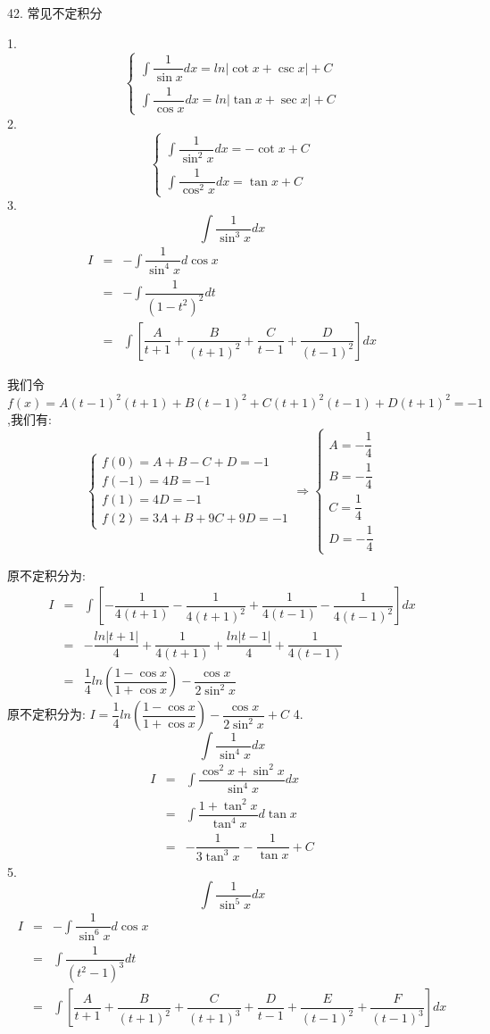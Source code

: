42. 常见不定积分
\begin{anymark}[常见不定积分]
	1. $$\left\lbrace
	\begin{array}{l}
		\int \dfrac{1}{\sin x}dx=ln|\cot x+\csc x|+C\\
		\int \dfrac{1}{\cos x}dx=ln|\tan x+\sec x|+C
	\end{array}
	\right.$$
	2. $$\left\lbrace
	\begin{array}{l}
		\int \dfrac{1}{\sin^2 x}dx=-\cot x+C\\
		\int \dfrac{1}{\cos^2 x}dx=\tan x+C
	\end{array}
	\right.$$
	3. $$\int \dfrac{1}{\sin^3 x}dx$$
	\begin{eqnarray*}
		I&=&-\int \dfrac{1}{\sin^4 x}d\cos x\\
		&=&-\int \dfrac{1}{(1-t^2)^2}dt\\
		&=&\int\left[ \dfrac{A}{t+1}+\dfrac{B}{(t+1)^2}+\dfrac{C}{t-1}+\dfrac{D}{(t-1)^2}\right]dx 
	\end{eqnarray*}
	
	我们令$f(x)=A(t-1)^2(t+1)+B(t-1)^2+C(t+1)^2(t-1)+D(t+1)^2=-1$,我们有:  
	$$\left\lbrace
	\begin{array}{l}
		f(0)=A+B-C+D=-1\\
		f(-1)=4B=-1\\
		f(1)=4D=-1\\
		f(2)=3A+B+9C+9D=-1
	\end{array}
	\right. \Rightarrow \left\lbrace
	\begin{array}{l}
		A=-\dfrac{1}{4}\\
		B=-\dfrac{1}{4}\\
		C=\dfrac{1}{4}\\
		D=-\dfrac{1}{4}
	\end{array}
	\right. $$
	
	原不定积分为:  
	\begin{eqnarray*}
		I&=&\int\left[ -\dfrac{1}{4(t+1)}-\dfrac{1}{4(t+1)^2}+\dfrac{1}{4(t-1)}-\dfrac{1}{4(t-1)^2}\right]dx\\
		&=&-\dfrac{ln|t+1|}{4}+\dfrac{1}{4(t+1)}+\dfrac{ln|t-1|}{4}+\dfrac{1}{4(t-1)}\\
		&=&\dfrac{1}{4}ln\left(\dfrac{1-\cos x}{1+\cos x} \right)-\dfrac{\cos x}{2\sin^2 x}
	\end{eqnarray*}
	原不定积分为:  $I=\dfrac{1}{4}ln\left(\dfrac{1-\cos x}{1+\cos x} \right)-\dfrac{\cos x}{2\sin^2 x}+C$
	4. $$\int \dfrac{1}{\sin^4 x}dx$$
	\begin{eqnarray*}
		I&=&\int \dfrac{\cos^2 x+\sin^2 x}{\sin^4 x}dx\\
		&=&\int \dfrac{1+\tan^2 x}{\tan^4x}d\tan x\\
		&=&-\dfrac{1}{3\tan^3 x}-\dfrac{1}{\tan x}+C 
	\end{eqnarray*}
	5. $$\int \dfrac{1}{\sin^5 x}dx$$
	\begin{eqnarray*}
		I&=&-\int \dfrac{1}{\sin^6 x}d\cos x\\
		&=&\int \dfrac{1}{(t^2-1)^3}dt\\
		&=&\int\left[ \dfrac{A}{t+1}+\dfrac{B}{(t+1)^2}+\dfrac{C}{(t+1)^3}+\dfrac{D}{t-1}+\dfrac{E}{(t-1)^2}+\dfrac{F}{(t-1)^3}\right]dx 
	\end{eqnarray*}
	

\end{anymark}
